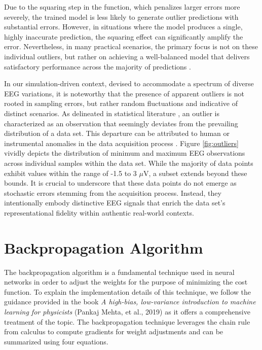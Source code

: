 \documentclass[a4paper, UKenglish, 11pt]{uiomaster}
\begin{document}
\begin{note}
  Due to the squaring step in the function, which penalizes larger errors more severely, the trained model is less likely to generate outlier predictions with substantial errors. However, in situations where the model produces a single, highly inaccurate prediction, the squaring effect can significantly amplify the error. Nevertheless, in many practical scenarios, the primary focus is not on these individual outliers, but rather on achieving a well-balanced model that delivers satisfactory performance across the majority of predictions \cite{builtin-ml-loss-functions}.

  In our simulation-driven context, devised to accommodate a spectrum of diverse EEG variations, it is noteworthy that the presence of apparent outliers is not rooted in sampling errors, but rather random fluctuations and indicative of distinct scenarios. As delineated in statistical literature \cite{barnett1994outliers}, an outlier is characterized as an observation that seemingly deviates from the prevailing distribution of a data set. This departure can be attributed to human or instrumental anomalies in the data acquisition process \cite{zhang2015outlier}. Figure \ref{fig:outliers} vividly depicts the distribution of minimum and maximum EEG observations across individual samples within the data set. While the majority of data points exhibit values within the range of -1.5 to 3 $\mu$V, a subset extends beyond these bounds. It is crucial to underscore that these data points do not emerge as stochastic errors stemming from the acquisition process. Instead, they intentionally embody distinctive EEG signals that enrich the data set's representational fidelity within authentic real-world contexts.
\end{note}





\section{Backpropagation Algorithm}

The backpropagation algorithm is a fundamental technique used in neural networks in order to adjust the weights for the purpose of minimizing the cost function. To explain the implementation details of this technique, we follow the guidance provided in the book \textit{A high-bias, low-variance introduction to machine learning for physicists} (Pankaj Mehta, et al., 2019) as it offers a comprehensive treatment of the topic. The backpropagation technique leverages the chain rule from calculus to compute gradients for weight adjustments and can be summarized using four equations.
\end{document}
